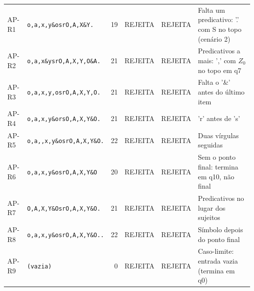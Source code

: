 {\begin{longtable}{l p{4cm} r p{2cm} p{2cm} p{3.8cm}}
AP-R1 & \texttt{o,\allowbreak{}a,\allowbreak{}x,\allowbreak{}y\&osrO,\allowbreak{}A,\allowbreak{}X\&Y.} & 19 & REJEITA & REJEITA & Falta um predicativo: '.' com S no topo (cenário 2) \\
AP-R2 & \texttt{o,\allowbreak{}a,\allowbreak{}x\&ysrO,\allowbreak{}A,\allowbreak{}X,\allowbreak{}Y,\allowbreak{}O\&A.} & 21 & REJEITA & REJEITA & Predicativos a mais: ',' com $Z_0$ no topo em q7 \\
AP-R3 & \texttt{o,\allowbreak{}a,\allowbreak{}x,\allowbreak{}y,\allowbreak{}osrO,\allowbreak{}A,\allowbreak{}X,\allowbreak{}Y,\allowbreak{}O.} & 21 & REJEITA & REJEITA & Falta o '\&' antes do último item \\
AP-R4 & \texttt{o,\allowbreak{}a,\allowbreak{}x,\allowbreak{}y\&orsO,\allowbreak{}A,\allowbreak{}X,\allowbreak{}Y\&O.} & 21 & REJEITA & REJEITA & 'r' antes de 's' \\
AP-R5 & \texttt{o,\allowbreak{}a,\allowbreak{},\allowbreak{}x,\allowbreak{}y\&osrO,\allowbreak{}A,\allowbreak{}X,\allowbreak{}Y\&O.} & 22 & REJEITA & REJEITA & Duas vírgulas seguidas \\
AP-R6 & \texttt{o,\allowbreak{}a,\allowbreak{}x,\allowbreak{}y\&osrO,\allowbreak{}A,\allowbreak{}X,\allowbreak{}Y\&O} & 20 & REJEITA & REJEITA & Sem o ponto final: termina em q10, não final \\
AP-R7 & \texttt{O,\allowbreak{}A,\allowbreak{}X,\allowbreak{}Y\&OsrO,\allowbreak{}A,\allowbreak{}X,\allowbreak{}Y\&O.} & 21 & REJEITA & REJEITA & Predicativos no lugar dos sujeitos \\
AP-R8 & \texttt{o,\allowbreak{}a,\allowbreak{}x,\allowbreak{}y\&osrO,\allowbreak{}A,\allowbreak{}X,\allowbreak{}Y\&O..} & 22 & REJEITA & REJEITA & Símbolo depois do ponto final \\
AP-R9 & \texttt{(vazia)} & 0 & REJEITA & REJEITA & Caso-limite: entrada vazia (termina em q0) \\
\end{longtable}}
